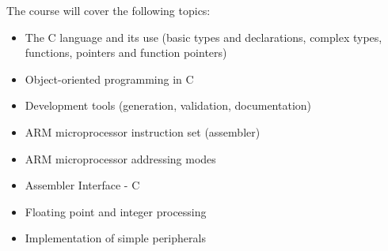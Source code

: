 The course will cover the following topics:
\begin{itemize}
    \item The C language and its use (basic types and declarations, complex types, functions, pointers and function pointers)
    \item Object-oriented programming in C
    \item Development tools (generation, validation, documentation)
    \item ARM microprocessor instruction set (assembler)
    \item ARM microprocessor addressing modes
    \item Assembler Interface - C
    \item Floating point and integer processing
    \item Implementation of simple peripherals
\end{itemize}